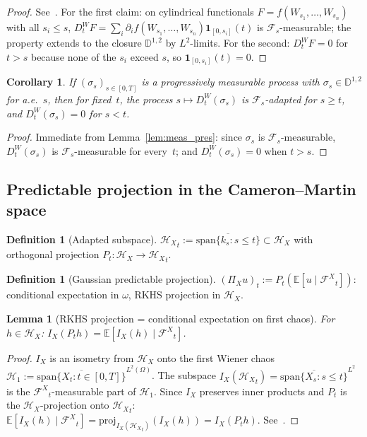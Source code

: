\documentclass[11pt,a4paper]{article}
\theoremstyle{plain}
\newtheorem{lemma}[theorem]{Lemma}
\newtheorem{corollary}[theorem]{Corollary}
\theoremstyle{definition}
\newtheorem{definition}[theorem]{Definition}
\theoremstyle{remark}
\newcommand{\E}{\mathbb{E}}
\newcommand{\HX}{\mathcal{H}_X}
\newcommand{\FX}{\mathcal{F}^X}
\begin{document}
\begin{proof}
See~\cite[Lemma 1.2.3]{Nualart2006}. For the first claim: on cylindrical functionals $F = f(W_{s_1},\ldots,W_{s_n})$ with all $s_i \le s$, $D_t^W F = \sum_i\partial_if(W_{s_1},\ldots,W_{s_n})\mathbf{1}_{[0,s_i]}(t)$ is $\mathcal{F}_s$-measurable; the property extends to the closure $\mathbb{D}^{1,2}$ by $L^2$-limits. For the second: $D_t^WF = 0$ for $t > s$ because none of the $s_i$ exceed $s$, so $\mathbf{1}_{[0,s_i]}(t) = 0$.
\end{proof}

\begin{corollary}\label{cor:adapted_mall}
If $(\sigma_s)_{s \in [0,T]}$ is a progressively measurable process with $\sigma_s \in \mathbb{D}^{1,2}$ for a.e.~$s$, then for fixed~$t$, the process $s \mapsto D_t^W(\sigma_s)$ is $\mathcal{F}_s$-adapted for $s \ge t$, and $D_t^W(\sigma_s) = 0$ for $s < t$.
\end{corollary}

\begin{proof}
Immediate from Lemma~\ref{lem:meas_pres}: since $\sigma_s$ is $\mathcal{F}_s$-measurable, $D_t^W(\sigma_s)$ is $\mathcal{F}_s$-measurable for every~$t$; and $D_t^W(\sigma_s) = 0$ when $t > s$.
\end{proof}

\subsection{Predictable projection in the Cameron--Martin space}

\begin{definition}[Adapted subspace]\label{def:adapted}
${\HX}_t := \overline{\mathrm{span}\{k_s : s \le t\}} \subset \HX$ with orthogonal projection $P_t : \HX \to {\HX}_t$.
\end{definition}

\begin{definition}[Gaussian predictable projection]\label{def:gauss_pred}
$(\Pi_Xu)_t := P_t(\E[u\mid{\FX}_t])$: conditional expectation in $\omega$, RKHS projection in $\HX$.
\end{definition}

\begin{lemma}[RKHS projection = conditional expectation on first chaos]\label{lem:rkhs_cond}
For $h \in \HX$: $I_X(P_th) = \E[I_X(h)\mid{\FX}_t]$.
\end{lemma}

\begin{proof}
$I_X$ is an isometry from $\HX$ onto the first Wiener chaos $\mathcal{H}_1 := \overline{\mathrm{span}\{X_t : t \in [0,T]\}}^{L^2(\Omega)}$. The subspace $I_X({\HX}_t) = \overline{\mathrm{span}\{X_s : s \le t\}}^{L^2}$ is the ${\FX}_t$-measurable part of $\mathcal{H}_1$. Since $I_X$ preserves inner products and $P_t$ is the $\HX$-projection onto ${\HX}_t$: $\E[I_X(h)\mid{\FX}_t] = \mathrm{proj}_{I_X({\HX}_t)}(I_X(h)) = I_X(P_th)$. See~\cite[Proposition 1.2.1]{Nualart2006}.
\end{proof}
\end{document}
